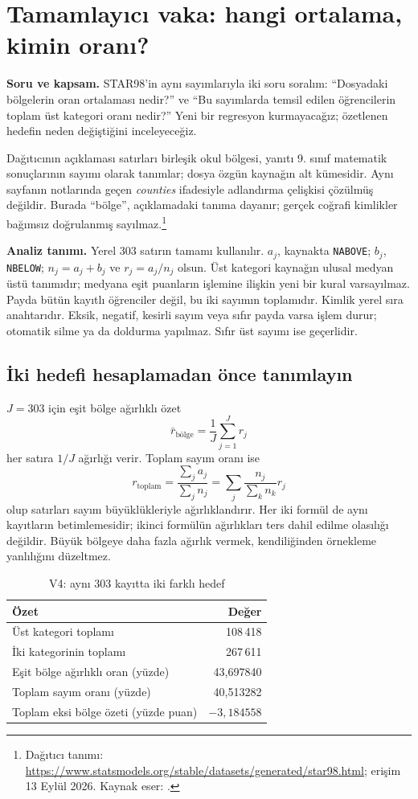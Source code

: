 \section{Tamamlayıcı vaka: hangi ortalama, kimin oranı?}
\label{sec:v4-star98}

\textbf{Soru ve kapsam.} STAR98'in aynı sayımlarıyla iki soru soralım:
``Dosyadaki bölgelerin oran ortalaması nedir?'' ve ``Bu sayımlarda temsil
edilen öğrencilerin toplam üst kategori oranı nedir?'' Yeni bir regresyon
kurmayacağız; özetlenen hedefin neden değiştiğini inceleyeceğiz.

Dağıtıcının açıklaması satırları birleşik okul bölgesi, yanıtı 9. sınıf
matematik sonuçlarının sayımı olarak tanımlar; dosya özgün kaynağın alt
kümesidir. Aynı sayfanın notlarında geçen \textit{counties} ifadesiyle
adlandırma çelişkisi çözülmüş değildir. Burada ``bölge'', açıklamadaki
tanıma dayanır; gerçek coğrafi kimlikler bağımsız doğrulanmış sayılmaz.\footnote{Dağıtıcı tanımı:
\url{https://www.statsmodels.org/stable/datasets/generated/star98.html};
erişim 13 Eylül 2026. Kaynak eser: \citet{gill2001}.}

\textbf{Analiz tanımı.} Yerel 303 satırın tamamı kullanılır. $a_j$, kaynakta
\texttt{NABOVE}; $b_j$, \texttt{NBELOW}; $n_j=a_j+b_j$ ve $r_j=a_j/n_j$
olsun. Üst kategori kaynağın ulusal medyan üstü tanımıdır; medyana eşit
puanların işlemine ilişkin yeni bir kural varsayılmaz. Payda bütün kayıtlı
öğrenciler değil, bu iki sayımın toplamıdır. Kimlik yerel sıra anahtarıdır.
Eksik, negatif, kesirli sayım veya sıfır payda varsa işlem durur; otomatik
silme ya da doldurma yapılmaz. Sıfır üst sayımı ise geçerlidir.

\subsection*{İki hedefi hesaplamadan önce tanımlayın}

$J=303$ için eşit bölge ağırlıklı özet
\[
\bar r_{\mathrm{bölge}}=\frac{1}{J}\sum_{j=1}^{J}r_j
\]
her satıra $1/J$ ağırlığı verir. Toplam sayım oranı ise
\[
r_{\mathrm{toplam}}=\frac{\sum_j a_j}{\sum_j n_j}
=\sum_j\frac{n_j}{\sum_k n_k}r_j
\]
olup satırları sayım büyüklükleriyle ağırlıklandırır. Her iki formül de
aynı kayıtların betimlemesidir; ikinci formülün ağırlıkları ters dahil
edilme olasılığı değildir. Büyük bölgeye daha fazla ağırlık vermek,
kendiliğinden örnekleme yanlılığını düzeltmez.

\begin{table}[H]
\centering
\small
\caption{V4: aynı 303 kayıtta iki farklı hedef}
\label{tab:v4-hedefler}
\begin{tabularx}{\linewidth}{@{}Xr@{}}
\toprule
Özet & Değer \\
\midrule
Üst kategori toplamı & 108\,418 \\
İki kategorinin toplamı & 267\,611 \\
Eşit bölge ağırlıklı oran (yüzde) & 43,697840 \\
Toplam sayım oranı (yüzde) & 40,513282 \\
Toplam eksi bölge özeti (yüzde puan) & $-3{,}184558$ \\
\bottomrule
\end{tabularx}
\end{table}

